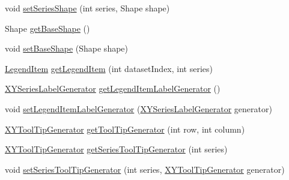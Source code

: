\begin{DoxyCompactItemize}
\item 
void \mbox{\hyperlink{interfaceorg_1_1jfree_1_1chart_1_1renderer_1_1xy_1_1_x_y_item_renderer_af6269fff1133f74297f63ef2fa5beac6}{set\+Series\+Shape}} (int series, Shape shape)
\item 
Shape \mbox{\hyperlink{interfaceorg_1_1jfree_1_1chart_1_1renderer_1_1xy_1_1_x_y_item_renderer_a3e28915be3dab2e9d8708ab6b92f9e5e}{get\+Base\+Shape}} ()
\item 
void \mbox{\hyperlink{interfaceorg_1_1jfree_1_1chart_1_1renderer_1_1xy_1_1_x_y_item_renderer_ae37032e410d9bb4b4349732c8c72dcb4}{set\+Base\+Shape}} (Shape shape)
\item 
\mbox{\hyperlink{classorg_1_1jfree_1_1chart_1_1_legend_item}{Legend\+Item}} \mbox{\hyperlink{interfaceorg_1_1jfree_1_1chart_1_1renderer_1_1xy_1_1_x_y_item_renderer_a792c3e8c39bf57711528cd8064d2ddb5}{get\+Legend\+Item}} (int dataset\+Index, int series)
\item 
\mbox{\hyperlink{interfaceorg_1_1jfree_1_1chart_1_1labels_1_1_x_y_series_label_generator}{X\+Y\+Series\+Label\+Generator}} \mbox{\hyperlink{interfaceorg_1_1jfree_1_1chart_1_1renderer_1_1xy_1_1_x_y_item_renderer_a12f264f4a63fb4b0f1594c6a9ca1c5e5}{get\+Legend\+Item\+Label\+Generator}} ()
\item 
void \mbox{\hyperlink{interfaceorg_1_1jfree_1_1chart_1_1renderer_1_1xy_1_1_x_y_item_renderer_ad57737bb623ca88dec6dd3fb90a3e8fe}{set\+Legend\+Item\+Label\+Generator}} (\mbox{\hyperlink{interfaceorg_1_1jfree_1_1chart_1_1labels_1_1_x_y_series_label_generator}{X\+Y\+Series\+Label\+Generator}} generator)
\item 
\mbox{\hyperlink{interfaceorg_1_1jfree_1_1chart_1_1labels_1_1_x_y_tool_tip_generator}{X\+Y\+Tool\+Tip\+Generator}} \mbox{\hyperlink{interfaceorg_1_1jfree_1_1chart_1_1renderer_1_1xy_1_1_x_y_item_renderer_a90ed45f2e76d920007c655208d980dc0}{get\+Tool\+Tip\+Generator}} (int row, int column)
\item 
\mbox{\hyperlink{interfaceorg_1_1jfree_1_1chart_1_1labels_1_1_x_y_tool_tip_generator}{X\+Y\+Tool\+Tip\+Generator}} \mbox{\hyperlink{interfaceorg_1_1jfree_1_1chart_1_1renderer_1_1xy_1_1_x_y_item_renderer_abd9e042bb8bfa4f20a45346e850710b8}{get\+Series\+Tool\+Tip\+Generator}} (int series)
\item 
void \mbox{\hyperlink{interfaceorg_1_1jfree_1_1chart_1_1renderer_1_1xy_1_1_x_y_item_renderer_a4198dcc9fc6534f6373dad286980d12b}{set\+Series\+Tool\+Tip\+Generator}} (int series, \mbox{\hyperlink{interfaceorg_1_1jfree_1_1chart_1_1labels_1_1_x_y_tool_tip_generator}{X\+Y\+Tool\+Tip\+Generator}} generator)

\end{DoxyCompactItemize}
